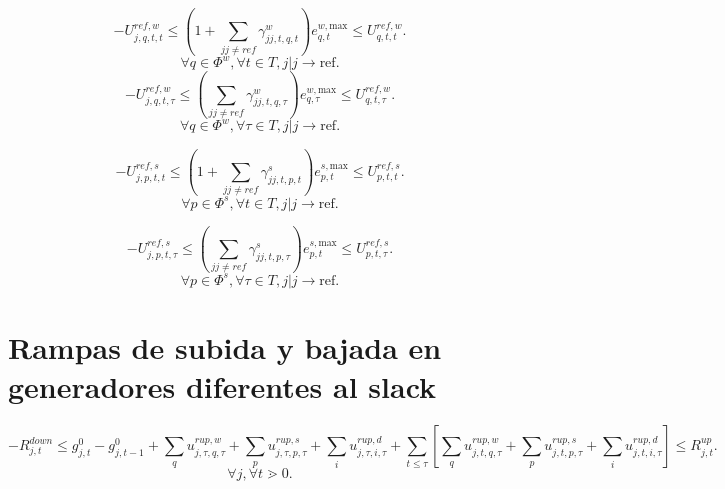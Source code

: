 \begin{equation}
-U_{j,q,t,t}^{ref,w} \le \left (1 + \sum_{jj \neq{} ref} \gamma_{jj,t,q,t}^{w} \right )e_{q,t}^{w, \text{max}} \le U_{q,t,t}^{ref,w}.
\end{equation}
\begin{equation*}
    \forall q \in \Phi^{w}, \forall t \in T, j|j \rightarrow \text{ref}.
\end{equation*}
\begin{equation}
-U_{j,q,t,\tau}^{ref,w} \le \left (\sum_{jj \neq{} ref} \gamma_{jj,t,q,\tau}^{w} \right )e_{q,\tau}^{w, \text{max}} \le U_{q,t,\tau}^{ref,w}.
\end{equation}
\begin{equation*}
    \forall q \in \Phi^{w}, \forall \tau \in T, j|j \rightarrow \text{ref}.
\end{equation*}

\begin{equation}
-U_{j,p,t,t}^{ref,s} \le \left (1 + \sum_{jj \neq{} ref} \gamma_{jj,t,p,t}^{s} \right )e_{p,t}^{s, \text{max}} \le U_{p,t,t}^{ref,s}.
\end{equation}
\begin{equation*}
    \forall p \in \Phi^{s}, \forall t \in T, j|j \rightarrow \text{ref}.
\end{equation*}

\begin{equation}
-U_{j,p,t,\tau}^{ref,s} \le \left (\sum_{jj \neq{} ref} \gamma_{jj,t,p,\tau}^{s} \right )e_{p,t}^{s, \text{max}} \le U_{p,t,\tau}^{ref,s}.
\end{equation}
\begin{equation*}
    \forall p \in \Phi^{s}, \forall \tau \in T, j|j \rightarrow \text{ref}.
\end{equation*}

\section{Rampas de subida y bajada en generadores diferentes al slack}

\begin{dmath}
-R^{down}_{j,t} \le g^{0}_{j,t} - g^{0}_{j,t-1} + \sum_{q}u^{rup,w}_{j,\tau,q,\tau} + \sum_{p}u^{rup,s}_{j,\tau,p,\tau} + \sum_iu^{rup,d}_{j,\tau,i,\tau} + \sum_{t\le \tau} \left[ \sum_{q}u^{rup,w}_{j,t,q,\tau} + \sum_{p}u^{rup,s}_{j,t,p,\tau} + \sum_iu^{rup,d}_{j,t,i,\tau} \right ] \le R^{up}_{j,t}.
\end{dmath}
\begin{equation*}
    \forall j, \forall t \gtrdot 0.
\end{equation*}

